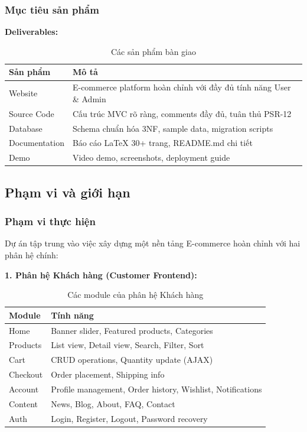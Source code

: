 \subsubsection{Mục tiêu sản phẩm}

\textbf{Deliverables:}
\begin{table}[H]
\centering
\begin{tabular}{|l|p{10cm}|}
\hline
\textbf{Sản phẩm} & \textbf{Mô tả} \\
\hline
Website & E-commerce platform hoàn chỉnh với đầy đủ tính năng User \& Admin \\
\hline
Source Code & Cấu trúc MVC rõ ràng, comments đầy đủ, tuân thủ PSR-12 \\
\hline
Database & Schema chuẩn hóa 3NF, sample data, migration scripts \\
\hline
Documentation & Báo cáo LaTeX 30+ trang, README.md chi tiết \\
\hline
Demo & Video demo, screenshots, deployment guide \\
\hline
\end{tabular}
\caption{Các sản phẩm bàn giao}
\label{tab:deliverables}
\end{table}

\subsection{Phạm vi và giới hạn}

\subsubsection{Phạm vi thực hiện}

Dự án tập trung vào việc xây dựng một nền tảng E-commerce hoàn chỉnh với hai phân hệ chính:

\textbf{1. Phân hệ Khách hàng (Customer Frontend):}
\begin{table}[H]
\centering
\begin{tabular}{|l|p{8cm}|}
\hline
\textbf{Module} & \textbf{Tính năng} \\
\hline
Home & Banner slider, Featured products, Categories \\
\hline
Products & List view, Detail view, Search, Filter, Sort \\
\hline
Cart & CRUD operations, Quantity update (AJAX) \\
\hline
Checkout & Order placement, Shipping info \\
\hline
Account & Profile management, Order history, Wishlist, Notifications \\
\hline
Content & News, Blog, About, FAQ, Contact \\
\hline
Auth & Login, Register, Logout, Password recovery \\
\hline
\end{tabular}
\caption{Các module của phân hệ Khách hàng}
\label{tab:customer-modules}
\end{table}

